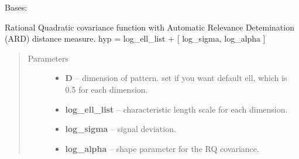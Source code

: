\documentclass[letterpaper,10pt,english]{sphinxmanual}
\begin{document}
\begin{fulllineitems}
\label{pyGPs.Core:pyGPs.Core.cov.RQard}
Bases: 

Rational Quadratic covariance function with Automatic Relevance Detemination
(ARD) distance measure.
hyp = log\_ell\_list + {[} log\_sigma, log\_alpha {]}
\begin{quote}\begin{description}
\item[{Parameters}] \leavevmode\begin{itemize}
\item {} 
\textbf{D} -- dimension of pattern. set if you want default ell, which is 0.5 for each dimension.

\item {} 
\textbf{log\_ell\_list} -- characteristic length scale for each dimension.

\item {} 
\textbf{log\_sigma} -- signal deviation.

\item {} 
\textbf{log\_alpha} -- shape parameter for the RQ covariance.

\end{itemize}

\end{description}\end{quote}

\begin{fulllineitems}
\label{pyGPs.Core:pyGPs.Core.cov.RQard.getCovMatrix}
\end{fulllineitems}


\begin{fulllineitems}
\label{pyGPs.Core:pyGPs.Core.cov.RQard.getDerMatrix}
\end{fulllineitems}


\end{fulllineitems}

\end{document}
